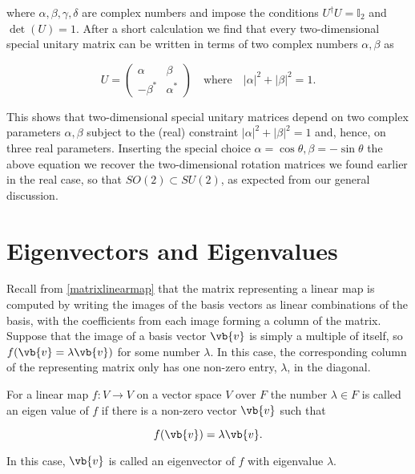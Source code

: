 \documentclass[a4paper,12pt]{report}
\begin{document}
where \(\alpha, \beta, \gamma, \delta\) are complex numbers and impose the conditions \( U^\dagger U = \mathbb{I}_2 \) and \(\det(U) = 1\). After a short calculation we find that every two-dimensional special unitary matrix can be written in terms of two complex numbers \(\alpha, \beta\) as

\begin{equation}
U = \begin{pmatrix}
\alpha & \beta \\
-\beta^* & \alpha^*
\end{pmatrix}
\quad \text{where} \quad |\alpha|^2 + |\beta|^2 = 1.
\end{equation}

This shows that two-dimensional special unitary matrices depend on two complex parameters \(\alpha, \beta\) subject to the (real) constraint \(|\alpha|^2 + |\beta|^2 = 1\) and, hence, on three real parameters. Inserting the special choice \(\alpha = \cos \theta, \beta = -\sin \theta\) the above equation we recover the two-dimensional rotation matrices we found earlier in the real case, so that \(SO(2) \subset SU(2)\), as expected from our general discussion.

\chapter{Eigenvectors and Eigenvalues}

Recall from \cref{matrixlinearmap}  that the  matrix representing a linear map is computed by writing the images of the basis vectors as linear combinations of the basis, with the coefficients from each image forming a column of the matrix. Suppose that the image of a basis vector \(\vb{v} \) is simply a multiple of itself, so \(f(\vb{v} = \lambda \vb{v} )\) for some number \(\lambda \). In this case, the corresponding column of the representing matrix only has one non-zero entry, \(\lambda \), in the diagonal. 

\begin{definition}
For a linear map \(f:V \rightarrow V\) on a vector space \(V\) over \(F\) the number \(\lambda \in F\) is called an eigen value of \(f\) if there is a non-zero vector \(\vb{v} \) such that 

\begin{equation}
    f(\vb{v} ) = \lambda \vb{v} .
\end{equation}

In this case, \(\vb{v} \) is called an eigenvector of \(f\) with eigenvalue \(\lambda \).   

\end{definition}
\end{document}
